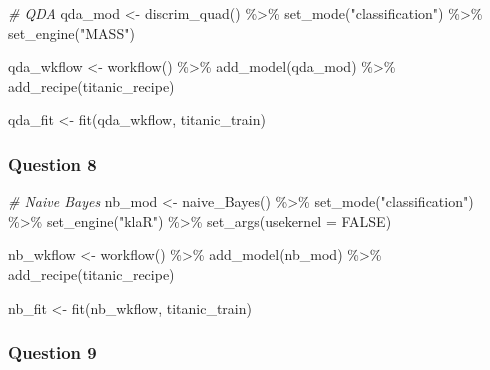 \documentclass[
]{article}
\newenvironment{Shaded}{\begin{snugshade}}{\end{snugshade}}
\newcommand{\AttributeTok}[1]{\textcolor[rgb]{0.77,0.63,0.00}{#1}}
\newcommand{\CommentTok}[1]{\textcolor[rgb]{0.56,0.35,0.01}{\textit{#1}}}
\newcommand{\ConstantTok}[1]{\textcolor[rgb]{0.00,0.00,0.00}{#1}}
\newcommand{\FunctionTok}[1]{\textcolor[rgb]{0.00,0.00,0.00}{#1}}
\newcommand{\NormalTok}[1]{#1}
\newcommand{\OtherTok}[1]{\textcolor[rgb]{0.56,0.35,0.01}{#1}}
\newcommand{\SpecialCharTok}[1]{\textcolor[rgb]{0.00,0.00,0.00}{#1}}
\newcommand{\StringTok}[1]{\textcolor[rgb]{0.31,0.60,0.02}{#1}}
\begin{document}
\begin{Shaded}
\begin{Highlighting}[]
\CommentTok{\# QDA}
\NormalTok{qda\_mod }\OtherTok{\textless{}{-}} \FunctionTok{discrim\_quad}\NormalTok{() }\SpecialCharTok{\%\textgreater{}\%}
  \FunctionTok{set\_mode}\NormalTok{(}\StringTok{"classification"}\NormalTok{) }\SpecialCharTok{\%\textgreater{}\%}
  \FunctionTok{set\_engine}\NormalTok{(}\StringTok{"MASS"}\NormalTok{)}

\NormalTok{qda\_wkflow }\OtherTok{\textless{}{-}} \FunctionTok{workflow}\NormalTok{() }\SpecialCharTok{\%\textgreater{}\%}
  \FunctionTok{add\_model}\NormalTok{(qda\_mod) }\SpecialCharTok{\%\textgreater{}\%}
  \FunctionTok{add\_recipe}\NormalTok{(titanic\_recipe)}

\NormalTok{qda\_fit }\OtherTok{\textless{}{-}} \FunctionTok{fit}\NormalTok{(qda\_wkflow, titanic\_train)}
\end{Highlighting}
\end{Shaded}

\hypertarget{question-8}{%
\subsubsection{Question 8}\label{question-8}}

\begin{Shaded}
\begin{Highlighting}[]
\CommentTok{\# Naive Bayes}
\NormalTok{nb\_mod }\OtherTok{\textless{}{-}} \FunctionTok{naive\_Bayes}\NormalTok{() }\SpecialCharTok{\%\textgreater{}\%}
  \FunctionTok{set\_mode}\NormalTok{(}\StringTok{"classification"}\NormalTok{) }\SpecialCharTok{\%\textgreater{}\%}
  \FunctionTok{set\_engine}\NormalTok{(}\StringTok{"klaR"}\NormalTok{) }\SpecialCharTok{\%\textgreater{}\%}
  \FunctionTok{set\_args}\NormalTok{(}\AttributeTok{usekernel =} \ConstantTok{FALSE}\NormalTok{)}

\NormalTok{nb\_wkflow }\OtherTok{\textless{}{-}} \FunctionTok{workflow}\NormalTok{() }\SpecialCharTok{\%\textgreater{}\%}
  \FunctionTok{add\_model}\NormalTok{(nb\_mod) }\SpecialCharTok{\%\textgreater{}\%}
  \FunctionTok{add\_recipe}\NormalTok{(titanic\_recipe)}

\NormalTok{nb\_fit }\OtherTok{\textless{}{-}} \FunctionTok{fit}\NormalTok{(nb\_wkflow, titanic\_train)}
\end{Highlighting}
\end{Shaded}

\hypertarget{question-9}{%
\subsubsection{Question 9}\label{question-9}}
\end{document}
